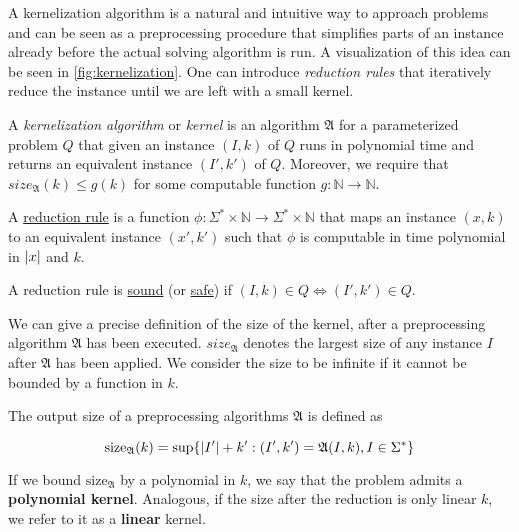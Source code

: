A kernelization algorithm is a natural and intuitive way to approach problems and can be seen as a preprocessing procedure that simplifies parts of an instance already before the actual solving algorithm is run. 
A visualization of this idea can be seen in \cref{fig:kernelization}.
One can introduce \textit{reduction rules} that iteratively reduce the instance until we are left with a small kernel.   

\begin{definition}
A \textit{kernelization algorithm} or \textit{kernel} is an algorithm $\mathfrak{A}$ for a parameterized problem $Q$ that given an instance $(I,k)$ of $Q$ runs in polynomial time and returns an equivalent instance $(I', k')$ of $Q$. Moreover, we require that $size_{\mathfrak{A}}(k) \leq g(k)$ for some computable function $g:\mathbb{N} \rightarrow \mathbb{N}$.

A \underline{reduction rule} is a function $\phi:\Sigma^* \times \mathbb{N} \rightarrow \Sigma^* \times \mathbb{N}$ that maps an instance $(x,k)$ to an equivalent instance $(x',k')$ such that $\phi$ is computable in time polynomial in $\abs{x}$ and $k$.

A reduction rule is \underline{sound} (or \underline{safe}) if $(I, k) \in Q \Leftrightarrow (I',k') \in Q$.
\end{definition}

We can give a precise definition of the size of the kernel, after a preprocessing algorithm $\mathfrak{A}$ has been executed.
$size_{\mathfrak{A}}$ denotes the largest size of any instance $I$ after $\mathfrak{A}$ has been applied.
We consider the size to be infinite if it cannot be bounded by a function in $k$.

\begin{definition} The output size of a preprocessing algorithms $\mathfrak{A}$ is defined as 

    \[\mathrm{size}_{\mathfrak{A}}(k) = \sup\{\abs{I'} + k': (I',k')= \mathfrak{A}(I,k), I \in \Sigma^* \} \]
\end{definition}

If we bound $\mathrm{size}_{\mathfrak{A}}$ by a polynomial in $k$, we say that the problem admits a \textbf{polynomial kernel}.  
Analogous, if the size after the reduction is only linear $k$, we refer to it as a \textbf{linear} kernel.


